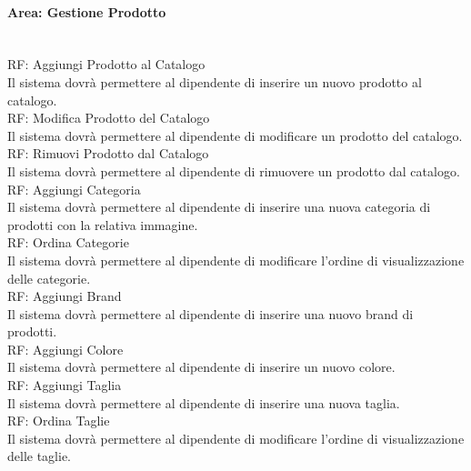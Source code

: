 \paragraph{Area: Gestione Prodotto}\mbox{}\\
RF\thecontrequisiti: Aggiungi Prodotto al Catalogo\\
Il sistema dovrà permettere al dipendente di inserire un nuovo prodotto al catalogo.\vspace{10px} \\ 
RF\thecontrequisiti: Modifica Prodotto del Catalogo\\
Il sistema dovrà permettere al dipendente di modificare un prodotto del catalogo.\vspace{10px} \\ 
RF\thecontrequisiti: Rimuovi Prodotto dal Catalogo\\
Il sistema dovrà permettere al dipendente di rimuovere un prodotto dal catalogo.\vspace{10px} \\ 
RF\thecontrequisiti: Aggiungi Categoria\\
Il sistema dovrà permettere al dipendente di inserire una nuova categoria di prodotti con la relativa immagine.\vspace{10px} \\ 
RF\thecontrequisiti: Ordina Categorie\\
Il sistema dovrà permettere al dipendente di modificare l'ordine di visualizzazione delle categorie.\vspace{10px} \\ 
RF\thecontrequisiti: Aggiungi Brand\\
Il sistema dovrà permettere al dipendente di inserire una nuovo brand di prodotti.\vspace{10px} \\ 
RF\thecontrequisiti: Aggiungi Colore\\
Il sistema dovrà permettere al dipendente di inserire un nuovo colore.\vspace{10px} \\ 
RF\thecontrequisiti: Aggiungi Taglia\\
Il sistema dovrà permettere al dipendente di inserire una nuova taglia.\vspace{10px} \\ 
RF\thecontrequisiti: Ordina Taglie\\
Il sistema dovrà permettere al dipendente di modificare l'ordine di visualizzazione delle taglie.\vspace{10px} \\ 


